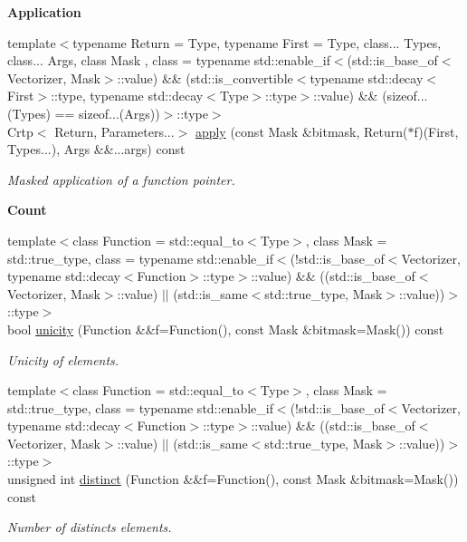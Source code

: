 \begin{Indent}{\bf Application}
\begin{DoxyCompactItemize}
{\footnotesize template$<$typename Return  = Type, typename First  = Type, class... Types, class... Args, class Mask , class  = typename std\-::enable\-\_\-if$<$(std\-::is\-\_\-base\-\_\-of$<$\-Vectorizer, Mask$>$\-::value) \&\& (std\-::is\-\_\-convertible$<$typename std\-::decay$<$\-First$>$\-::type, typename std\-::decay$<$\-Type$>$\-::type$>$\-::value) \&\& (sizeof...(\-Types) == sizeof...(\-Args))$>$\-::type$>$ }\\Crtp$<$ Return, Parameters...$>$ \hyperlink{classmagrathea_1_1AbstractNArray_a52d26db2f1a6b22ecf7a5807257f84ee}{apply} (const Mask \&bitmask, Return($\ast$f)(First, Types...), Args \&\&...args) const 
\begin{DoxyCompactList}\small\item\em Masked application of a function pointer. \end{DoxyCompactList}\end{DoxyCompactItemize}
\end{Indent}
\begin{Indent}{\bf Count}\par
\begin{DoxyCompactItemize}
\item 
{\footnotesize template$<$class Function  = std\-::equal\-\_\-to$<$\-Type$>$, class Mask  = std\-::true\-\_\-type, class  = typename std\-::enable\-\_\-if$<$(!std\-::is\-\_\-base\-\_\-of$<$\-Vectorizer, typename std\-::decay$<$\-Function$>$\-::type$>$\-::value) \&\& ((std\-::is\-\_\-base\-\_\-of$<$\-Vectorizer, Mask$>$\-::value) $|$$|$ (std\-::is\-\_\-same$<$std\-::true\-\_\-type, Mask$>$\-::value))$>$\-::type$>$ }\\bool \hyperlink{classmagrathea_1_1AbstractNArray_a1e82438ed847b54ec390438fdaba49f8}{unicity} (Function \&\&f=Function(), const Mask \&bitmask=Mask()) const 
\begin{DoxyCompactList}\small\item\em Unicity of elements. \end{DoxyCompactList}\item 
{\footnotesize template$<$class Function  = std\-::equal\-\_\-to$<$\-Type$>$, class Mask  = std\-::true\-\_\-type, class  = typename std\-::enable\-\_\-if$<$(!std\-::is\-\_\-base\-\_\-of$<$\-Vectorizer, typename std\-::decay$<$\-Function$>$\-::type$>$\-::value) \&\& ((std\-::is\-\_\-base\-\_\-of$<$\-Vectorizer, Mask$>$\-::value) $|$$|$ (std\-::is\-\_\-same$<$std\-::true\-\_\-type, Mask$>$\-::value))$>$\-::type$>$ }\\unsigned int \hyperlink{classmagrathea_1_1AbstractNArray_aaa8ea5e494c69f5c5874bfd30d6b9e4f}{distinct} (Function \&\&f=Function(), const Mask \&bitmask=Mask()) const 
\begin{DoxyCompactList}\small\item\em Number of distincts elements. \end{DoxyCompactList}\end{DoxyCompactItemize}
\end{Indent}
